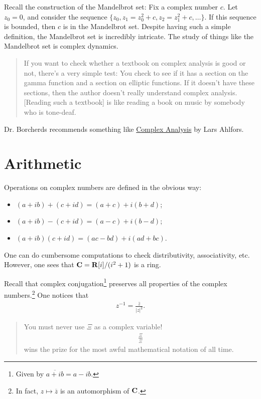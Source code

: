 \documentclass[11pt, oneside,margin=1in]{article}
\begin{document}
Recall the construction of the Mandelbrot set: Fix a complex number $c$. Let $z_0=0$, and consider the sequence $\{z_0, z_1 = z_0^2 + c, z_2 = z_1^2 + c,\hdots\}$. If this sequence is bounded, then $c$ is in the Mandelbrot set. Despite having such a simple definition, the Mandelbrot set is incredibly intricate. The study of things like the Mandelbrot set is complex dynamics.

\begin{quote}
\small If you want to check whether a textbook on complex analysis is good or not, there's a very simple test: You check to see if it has a section on the gamma function and a section on elliptic functions. If it doesn't have these sections, then the author doesn't really understand complex analysis. [Reading such a textbook] is like reading a book on music by somebody who is tone-deaf.
\end{quote}
Dr. Borcherds recommends something like \underline{Complex Analysis} by Lars Ahlfors. 

\section{Arithmetic}
Operations on complex numbers are defined in the obvious way:
\begin{itemize}
	\item $(a+ib) +  (c+id) =  (a+c) + i (b+d)$;
	\item $(a+ib) - (c+id) =  (a-c) + i (b-d)$;
	\item $(a+ib) (c+id) =  (ac - bd) + i (ad + bc)$.
\end{itemize}

One can do cumbersome computations to check distributivity, associativity, etc. However, one sees that $\mathbf C = \mathbf R[i]/(i^2+1)$ is a ring.

Recall that complex conjugation\footnote{Given by $\overline{a+ib} = a-ib$.} preserves all properties of the complex numbers.\footnote{In fact, $z\longmapsto \overline{z}$ is an automorphism of $\mathbf C$.} One notices that 
\begin{align*}
	z^{-1} = \frac{\overline{z}}{\left\lvert z \right\rvert ^2}.
\end{align*}

\begin{quote}
\small You must never use $\Xi$ as a complex variable!
\begin{align*}
	\frac{\Xi}{\overline{\Xi}}
\end{align*} 
wins the prize for the most awful mathematical notation of all time.
\end{quote} %
\end{document}
